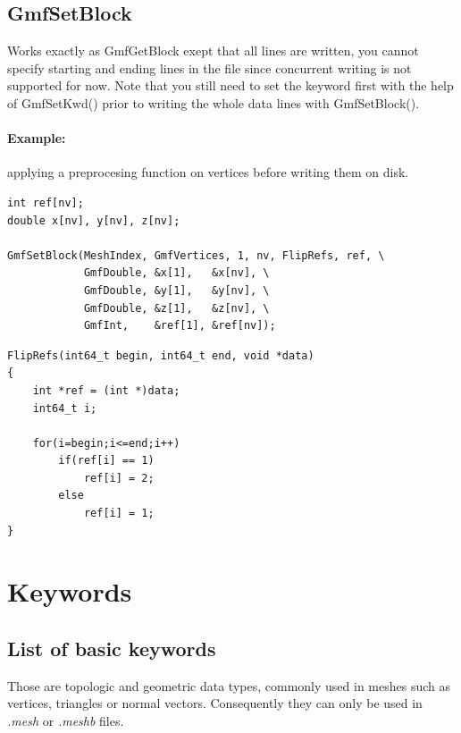\documentclass[a4paper,12pt]{article}
\begin{document}
\subsection{GmfSetBlock}
Works exactly as GmfGetBlock exept that all lines are written, you cannot specify starting and ending lines in the file since concurrent writing is not supported for now. Note that you still need to set the keyword first with the help of GmfSetKwd() prior to writing the whole data lines with GmfSetBlock().

\paragraph{Example:} applying a preprocesing function on vertices before writing them on disk.

\begin{tt}
\begin{verbatim}
int ref[nv];
double x[nv], y[nv], z[nv];

GmfSetBlock(MeshIndex, GmfVertices, 1, nv, FlipRefs, ref, \
            GmfDouble, &x[1],   &x[nv], \
            GmfDouble, &y[1],   &y[nv], \
            GmfDouble, &z[1],   &z[nv], \
            GmfInt,    &ref[1], &ref[nv]);
\end{verbatim}
\end{tt}
\normalfont

\begin{tt}
\begin{verbatim}
FlipRefs(int64_t begin, int64_t end, void *data)
{
    int *ref = (int *)data;
    int64_t i;

    for(i=begin;i<=end;i++)
        if(ref[i] == 1)
            ref[i] = 2;
        else
            ref[i] = 1;
}
\end{verbatim}
\end{tt}
\normalfont


%
%

\newpage
\section{Keywords}
\label{keywords}

\subsection{List of basic keywords}

Those are topologic and geometric data types, commonly used in meshes such as vertices, triangles or normal vectors. Consequently they can only be used in \emph{.mesh} or \emph{.meshb} files.
\end{document}
